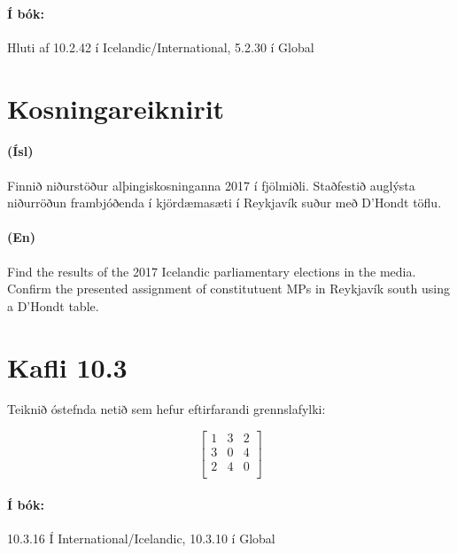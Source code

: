 \documentclass{article}
\begin{document}
\paragraph{Í bók:} Hluti af 10.2.42 í Icelandic/International, 5.2.30 í Global

\newpage

\section{Kosningareiknirit}

\question 

\paragraph{(Ísl)} Finnið niðurstöður alþingiskosninganna 2017 í fjölmiðli. Staðfestið auglýsta niðurröðun frambjóðenda í kjördæmasæti í Reykjavík suður með D'Hondt töflu.

\paragraph{(En)} Find the results of the 2017 Icelandic parliamentary elections in the media. Confirm the presented assignment of constitutuent MPs in Reykjavík south using a D'Hondt table.

\section{Kafli 10.3}

\question Teiknið óstefnda netið sem hefur eftirfarandi grennslafylki:

\[
\begin{bmatrix}
1& 3& 2\\
3& 0& 4\\
2& 4& 0\\
\end{bmatrix}
\]

\paragraph{Í bók:} 10.3.16 Í International/Icelandic, 10.3.10 í Global
\end{document}
